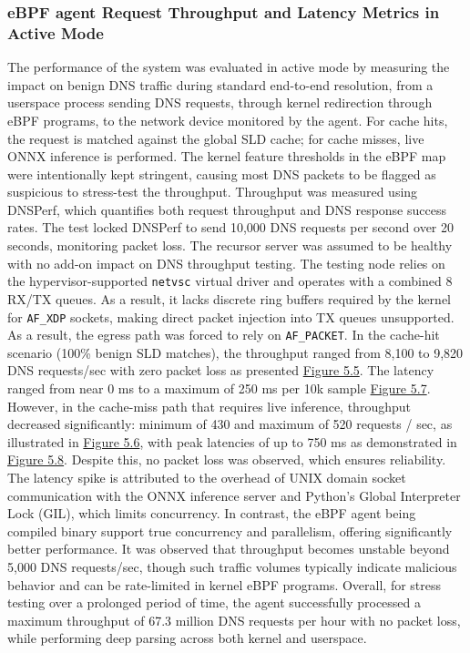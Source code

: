 \documentclass [11pt, proquest] {uwthesis}[2020/02/24]
\begin{document}
\subsubsection{eBPF agent Request Throughput and Latency Metrics in Active Mode}
The performance of the system was evaluated in active mode by measuring the impact on benign DNS traffic during standard end-to-end resolution, from a userspace process sending DNS requests, through kernel redirection through eBPF programs, to the network device monitored by the agent. For cache hits, the request is matched against the global SLD cache; for cache misses, live ONNX inference is performed. The kernel feature thresholds in the eBPF map were intentionally kept stringent, causing most DNS packets to be flagged as suspicious to stress-test the throughput. Throughput was measured using DNSPerf, which quantifies both request throughput and DNS response success rates. The test locked DNSPerf to send 10,000 DNS requests per second over 20 seconds, monitoring packet loss. The recursor server was assumed to be healthy with no add-on impact on DNS throughput testing. The testing node relies on the hypervisor-supported \texttt{netvsc} virtual driver and operates with a combined 8 RX/TX queues. As a result, it lacks discrete ring buffers required by the kernel for \texttt{AF\_XDP} sockets, making direct packet injection into TX queues unsupported. As a result, the egress path was forced to rely on \texttt{AF\_PACKET}. In the cache-hit scenario (100\% benign SLD matches), the throughput ranged from 8,100 to 9,820 DNS requests/sec with zero packet loss as presented \hyperref[fig:throughput_gsld]{Figure 5.5}. The latency ranged from near 0 ms to a maximum of 250 ms per 10k sample \hyperlink{fig:latency_gsld}{Figure 5.7}. However, in the cache-miss path that requires live inference, throughput decreased significantly: minimum of 430 and maximum of 520 requests / sec, as illustrated in \hyperref[fig:throughput_onnx]{Figure 5.6}, with peak latencies of up to 750 ms as demonstrated in \hyperref[figC:latency_onnx]{Figure 5.8}. Despite this, no packet loss was observed, which ensures reliability. The latency spike is attributed to the overhead of UNIX domain socket communication with the ONNX inference server and Python’s Global Interpreter Lock (GIL), which limits concurrency. In contrast, the eBPF agent being compiled binary support true concurrency and parallelism, offering significantly better performance.
It was observed that throughput becomes unstable beyond 5,000 DNS requests/sec, though such traffic volumes typically indicate malicious behavior and can be rate-limited in kernel eBPF programs. Overall, for stress testing over a prolonged period of time, the agent successfully processed a maximum throughput of 67.3 million DNS requests per hour with no packet loss, while performing deep parsing across both kernel and userspace.
\end{document}

